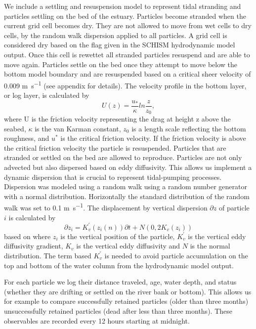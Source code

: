 \documentclass[npg, manuscript]{copernicus}
\begin{document}
We include a settling and resuspension model to represent tidal stranding and particles settling on the bed of the estuary.
Particles become stranded when the current grid cell becomes dry. 
They are not allowed to move from wet cells to dry cells, by the random walk dispersion applied to all particles.
A grid cell is considered dry based on the flag given in the SCHISM  hydrodynamic model output.
Once this cell is rewettet all stranded particles resuspend and are able to move again.
Particles settle on the bed once they attempt to move below the bottom model boundary and are resuspended based on a critical sheer velocity of 0.009 \unit{m s^{-1}} (see appendix for details).
The velocity profile in the bottom layer, or log layer, is calculated by
\begin{equation}
    U(z) = \frac{u_{*}}{\kappa} ln \frac{z}{z_{0}},
\end{equation}
where U is the friction velocity representing the drag at height z  above the seabed, $\kappa$ is the van Karman constant, $z_{0}$ is a length
scale reflecting the bottom roughness, and $u^{*}$ is the critical friction velocity.
If the friction velocity is above the critical friction velocity the particle is resuspended.
Particles that are stranded or settled on the bed are allowed to reproduce.
Particles are not only advected but also dispersed based on eddy diffusivity.
This allows us implement a dynamic dispersion that is crucial to represent tidal-pumping processes.
Dispersion was modeled using a random walk using a random number generator with a normal distribution.
Horizontally the standard distribution of the random walk was set to 0.1 \unit{m s^{-1}}.
The displacement by vertical dispersion $\partial z$ of particle $i$ is calculated by
\begin{equation}
    \partial z_{i} = K_{v}^{'}(z_{i}(n))\partial t + N(0, 2K_{v}(z_{i}))
\end{equation}
based on \citep{Yamazaki2014} where $z_{i}$ is the vertical position of the particle, $K_{v}^{'}$ is the vertical eddy diffusivity gradient, $K_{v}$ is the vertical eddy diffusivity and $N$ is the normal distribution.
The term based $K_{v}^{'}$ is needed to avoid particle accumulation on the top and bottom of the water column from the hydrodynamic model output.

For each particle we log their distance traveled, age, water depth, and status (whether they are drifting or settled on the river bank or bottom). This allows us for example to compare successfully retained particles (older than three months) unsuccessfully retained particles (dead after less than three months).
These observables are recorded every 12 hours starting at midnight.
\end{document}
